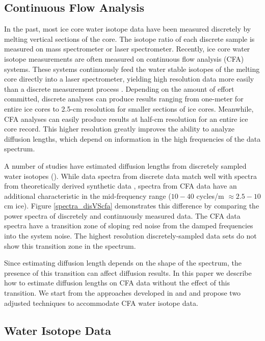 \documentclass[draft, jgrga]{AGUTeX}
\begin{document}
\begin{article}
\subsection{Continuous Flow Analysis}

In the past, most ice core water isotope data have been measured discretely by melting vertical sections of the core. The isotope ratio of each discrete sample is measured on mass spectrometer or laser spectrometer. Recently, ice core water isotope measurements are often measured on continuous flow analysis (CFA) systems. These systems continuously feed the water stable isotopes of the melting core directly into a laser spectrometer, yielding high resolution data more easily than a discrete measurement process \citep{Gkinis2011a,Emanuelsson2015,Jones2017b}. Depending on the amount of effort committed, discrete analyses can produce results ranging from one-meter for entire ice cores to 2.5-cm resolution for smaller sections of ice cores. Meanwhile, CFA analyses can easily produce results at half-cm resolution for an entire ice core record. This higher resolution greatly improves the ability to analyze diffusion lengths, which depend on information in the high frequencies of the data spectrum.

A number of studies have estimated diffusion lengths from discretely sampled water isotopes (\citep{Johnsen2000,Simonsen2011,Gkinis2014,vanderWel2015}). While data spectra from discrete data match well with spectra from theoretically derived synthetic data \citep{Holme2017}, spectra from CFA data have an additional characteristic in the mid-frequency range ($10-40$ cycles/m $\approx 2.5-10$ cm ice). Figure \ref{spectra_disVScfa} demonstrates this difference by comparing the power spectra of discretely and continuously measured data. The CFA data spectra have a transition zone of sloping red noise from the damped frequencies into the system noise. The highest resolution discretely-sampled data sets do not show this transition zone in the spectrum.

Since estimating diffusion length depends on the shape of the spectrum, the presence of this transition can affect diffusion results. In this paper we describe how to estimate diffusion lengths on CFA data without the effect of this transition. We start from the approaches developed in \citet{Johnsen2000} and \citet{Gkinis2014} and propose two adjusted techniques to accommodate CFA water isotope data.

\subsection{Water Isotope Data}


\end{article}
\end{document}
